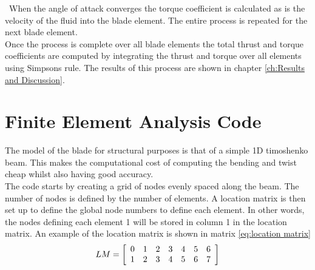 \documentclass[]{report}
\begin{document}
\ 
When the angle of attack converges the torque coefficient is calculated as is the velocity of the fluid into the blade element. The entire process is repeated for the next blade element. 
\\
Once the process is complete over all blade elements the total thrust and torque coefficients are computed by integrating the thrust and torque over all elements using Simpsons rule. The results of this process are shown in chapter \ref{ch:Results and Discussion}.

\section{Finite Element Analysis Code}
The model of the blade for structural purposes is that of a simple 1D timoshenko beam. This makes the computational cost of computing the bending and twist cheap whilst also having good accuracy. 
\\
The code starts by creating a grid of nodes evenly spaced along the beam. The number of nodes is defined by the number of elements. A location matrix is then set up to define the global node numbers to define each element. In other words, the nodes defining each element 1 will be stored in column 1 in the location matrix. An example of the location matrix  is shown in matrix \ref{eq:location matrix}
\begin{equation}
LM = 
 \left[ \begin{array}{ccccccc}
 	\centering
0 &1 &2 &3& 4& 5& 6\\
	1& 2& 3& 4& 5& 6& 7 
\end{array}\right]
\label{eq:location matrix}
\end{equation}
\end{document}
